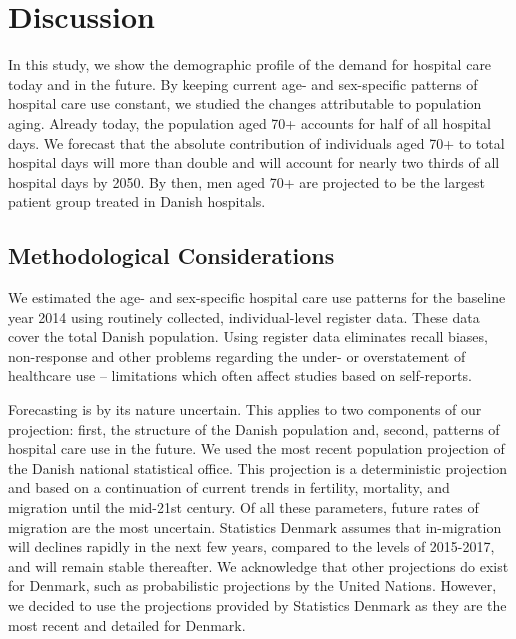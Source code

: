 

\section{Discussion}

In this study, we show the demographic profile of the demand for hospital 
care today and in the future. By keeping current age- and sex-specific patterns 
of hospital care use constant, we studied the changes attributable to population 
aging. Already today, the population aged 70+ accounts for half of all hospital 
days. We forecast that the absolute contribution of individuals aged 70+ to total 
hospital days will more than double and will account for nearly two thirds of all 
hospital days by 2050. By then, men aged 70+ are projected to be the largest 
patient group treated in Danish hospitals.\\
 
\subsection{Methodological Considerations}

We estimated the age- and sex-specific hospital care use patterns for the baseline 
year 2014 using routinely collected, individual-level register data. These data 
cover the total Danish population. Using register data eliminates recall biases, 
non-response and other problems regarding the under- or overstatement of healthcare 
use -- limitations which often affect studies based on self-reports.\citep{hunt2011women}

Forecasting is by its nature uncertain. This applies to two components of our 
projection: first, the structure of the Danish population and, second, patterns 
of hospital care use in the future. We used the most recent population projection 
of the Danish national statistical office. This projection is a deterministic 
projection and based on a continuation of current trends in fertility, mortality, 
and migration until the mid-21st century.\citep{denstat2018projection} Of all 
these parameters, future rates of migration are the most uncertain.\citep{de2010migration} 
Statistics Denmark assumes that in-migration will declines rapidly in the next 
few years, compared to the levels of 2015-2017, and will remain stable thereafter. 
We acknowledge that other projections do exist for Denmark, such as probabilistic 
projections by the United Nations.\citep{desa2017world} However, we decided to 
use the projections provided by Statistics  Denmark as they are the most recent 
and detailed for Denmark. 


